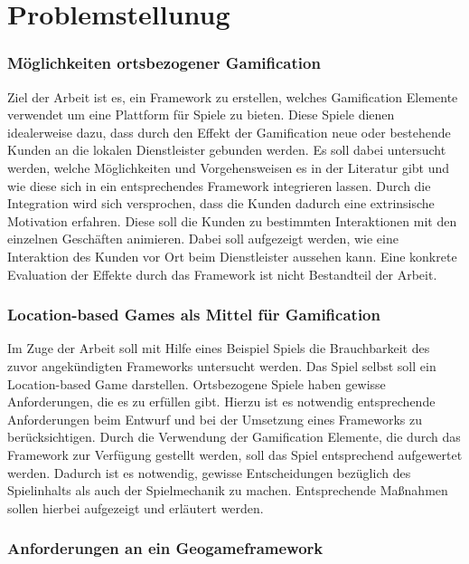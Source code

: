 \chapter{Problemstellunug}
\label{ch2:Problemstellunug}

\subsection*{Möglichkeiten ortsbezogener Gamification}

Ziel der Arbeit ist es, ein Framework zu erstellen, welches Gamification Elemente verwendet um eine Plattform für Spiele zu bieten. Diese Spiele dienen idealerweise dazu, dass durch den Effekt der Gamification neue oder bestehende Kunden an die lokalen Dienstleister gebunden werden. Es soll dabei untersucht werden, welche Möglichkeiten und Vorgehensweisen es in der Literatur gibt und wie diese sich in ein entsprechendes Framework integrieren lassen.
Durch die Integration wird sich versprochen, dass die Kunden dadurch eine extrinsische Motivation erfahren. Diese soll die Kunden zu bestimmten Interaktionen mit den einzelnen Geschäften animieren.
Dabei soll aufgezeigt werden, wie eine Interaktion des Kunden vor Ort beim Dienstleister aussehen kann. Eine konkrete Evaluation der Effekte durch das Framework ist nicht Bestandteil der Arbeit.

\subsection*{Location-based Games als Mittel für Gamification}

Im Zuge der Arbeit soll mit Hilfe eines Beispiel Spiels die Brauchbarkeit des zuvor angekündigten Frameworks untersucht werden.
Das Spiel selbst soll ein Location-based Game darstellen. Ortsbezogene Spiele haben gewisse Anforderungen, die es zu erfüllen gibt. Hierzu 
ist es notwendig entsprechende Anforderungen beim Entwurf und bei der Umsetzung eines Frameworks zu berücksichtigen.
Durch die Verwendung der Gamification Elemente, die durch das Framework zur Verfügung gestellt werden, soll das Spiel entsprechend aufgewertet werden. Dadurch ist es notwendig, gewisse Entscheidungen bezüglich des Spielinhalts als auch der Spielmechanik zu machen.
Entsprechende Maßnahmen sollen hierbei aufgezeigt und erläutert werden.

\subsection*{Anforderungen an ein Geogameframework}

